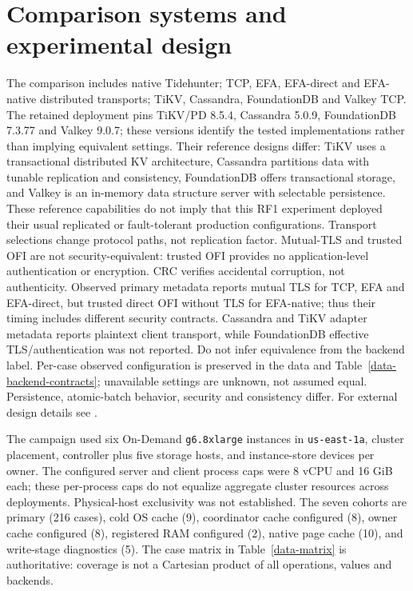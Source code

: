 \documentclass[11pt,a4paper]{article}
\begin{document}
\section{Comparison systems and experimental design}\label{sec:method}
The comparison includes native Tidehunter; TCP, EFA, EFA-direct and EFA-native distributed transports; TiKV, Cassandra, FoundationDB and Valkey TCP. The retained deployment pins TiKV/PD 8.5.4, Cassandra 5.0.9, FoundationDB 7.3.77 and Valkey 9.0.7; these versions identify the tested implementations rather than implying equivalent settings. Their reference designs differ: TiKV uses a transactional distributed KV architecture, Cassandra partitions data with tunable replication and consistency, FoundationDB offers transactional storage, and Valkey is an in-memory data structure server with selectable persistence. These reference capabilities do not imply that this RF1 experiment deployed their usual replicated or fault-tolerant production configurations. Transport selections change protocol paths, not replication factor. Mutual-TLS and trusted OFI are not security-equivalent: trusted OFI provides no application-level authentication or encryption. CRC verifies accidental corruption, not authenticity. Observed primary metadata reports mutual TLS for TCP, EFA and EFA-direct, but trusted direct OFI without TLS for EFA-native; thus their timing includes different security contracts. Cassandra and TiKV adapter metadata reports plaintext client transport, while FoundationDB effective TLS/authentication was not reported. Do not infer equivalence from the backend label. Per-case observed configuration is preserved in the data and Table~\ref{data-backend-contracts}; unavailable settings are unknown, not assumed equal. Persistence, atomic-batch behavior, security and consistency differ. For external design details see \cite{tikvstorage,cassandraengine,fdbarchitecture,valkeypersistence}.

The campaign used six On-Demand \texttt{g6.8xlarge} instances in \texttt{us-east-1a}, cluster placement, controller plus five storage hosts, and instance-store devices per owner. The configured server and client process caps were 8 vCPU and 16 GiB each; these per-process caps do not equalize aggregate cluster resources across deployments. Physical-host exclusivity was not established. The seven cohorts are primary (216 cases), cold OS cache (9), coordinator cache configured (8), owner cache configured (8), registered RAM configured (2), native page cache (10), and write-stage diagnostics (5). The case matrix in Table~\ref{data-matrix} is authoritative: coverage is not a Cartesian product of all operations, values and backends.
\end{document}
